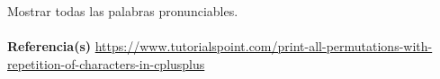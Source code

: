 Mostrar todas las palabras pronunciables.
\\{ }\\
\textbf{Referencia(s)}
\href{https://www.tutorialspoint.com/print-all-permutations-with-repetition-of-characters-in-cplusplus}{https://www.tutorialspoint.com/print-all-permutations-with-repetition-of-characters-in-cplusplus}